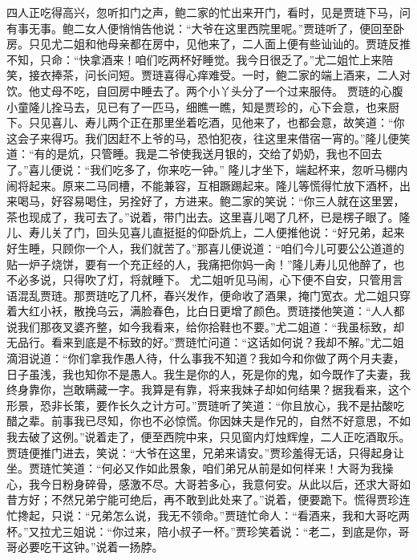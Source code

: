 \documentclass[12pt,oneside]{book}
\begin{document}
四人正吃得高兴，忽听扣门之声，鲍二家的忙出来开门，看时，见是贾琏下马，问有事无事。鲍二女人便悄悄告他说：“大爷在这里西院里呢。”贾琏听了，便回至卧房。只见尤二姐和他母亲都在房中，见他来了，二人面上便有些讪讪的。贾琏反推不知，只命：“快拿酒来！咱们吃两杯好睡觉。我今日很乏了。”尤二姐忙上来陪笑，接衣捧茶，问长问短。贾琏喜得心痒难受。一时，鲍二家的端上酒来，二人对饮。他丈母不吃，自回房中睡去了。两个小丫头分了一个过来服侍。
贾琏的心腹小童隆儿拴马去，见已有了一匹马，细瞧一瞧，知是贾珍的，心下会意，也来厨下。只见喜儿、寿儿两个正在那里坐着吃酒，见他来了，也都会意，故笑道：“你这会子来得巧。我们因赶不上爷的马，恐怕犯夜，往这里来借宿一宵的。”隆儿便笑道：“有的是炕，只管睡。我是二爷使我送月银的，交给了奶奶，我也不回去了。”喜儿便说：“我们吃多了，你来吃一钟。”
隆儿才坐下，端起杯来，忽听马棚内闹将起来。原来二马同槽，不能兼容，互相蹶踢起来。隆儿等慌得忙放下酒杯，出来喝马，好容易喝住，另拴好了，方进来。鲍二家的笑说：“你三人就在这里罢，茶也现成了，我可去了。”说着，带门出去。这里喜儿喝了几杯，已是楞子眼了。隆儿、寿儿关了门，回头见喜儿直挺挺的仰卧炕上，二人便推他说：“好兄弟，起来好生睡，只顾你一个人，我们就苦了。”那喜儿便说道：“咱们今儿可要公公道道的贴一炉子烧饼，要有一个充正经的人，我痛把你妈一肏！”隆儿寿儿见他醉了，也不必多说，只得吹了灯，将就睡下。
尤二姐听见马闹，心下便不自安，只管用言语混乱贾琏。那贾琏吃了几杯，春兴发作，便命收了酒果，掩门宽衣。尤二姐只穿着大红小袄，散挽乌云，满脸春色，比白日更增了颜色。贾琏搂他笑道：“人人都说我们那夜叉婆齐整，如今我看来，给你拾鞋也不要。”尤二姐道：“我虽标致，却无品行。看来到底是不标致的好。”贾琏忙问道：“这话如何说？我却不解。”尤二姐滴泪说道：“你们拿我作愚人待，什么事我不知道？我如今和你做了两个月夫妻，日子虽浅，我也知你不是愚人。我生是你的人，死是你的鬼，如今既作了夫妻，我终身靠你，岂敢瞒藏一字。我算是有靠，将来我妹子却如何结果？据我看来，这个形景，恐非长策，要作长久之计方可。”贾琏听了笑道：“你且放心，我不是拈酸吃醋之辈。前事我已尽知，你也不必惊慌。你因妹夫是作兄的，自然不好意思，不如我去破了这例。”说着走了，便至西院中来，只见窗内灯烛辉煌，二人正吃酒取乐。
贾琏便推门进去，笑说：“大爷在这里，兄弟来请安。”贾珍羞得无话，只得起身让坐。贾琏忙笑道：“何必又作如此景象，咱们弟兄从前是如何样来！大哥为我操心，我今日粉身碎骨，感激不尽。大哥若多心，我意何安。从此以后，还求大哥如昔方好；不然兄弟宁能可绝后，再不敢到此处来了。”说着，便要跪下。慌得贾珍连忙搀起，只说：“兄弟怎么说，我无不领命。”贾琏忙命人：“看酒来，我和大哥吃两杯。”又拉尤三姐说：“你过来，陪小叔子一杯。”贾珍笑着说：“老二，到底是你，哥哥必要吃干这钟。”说着一扬脖。
\end{document}
